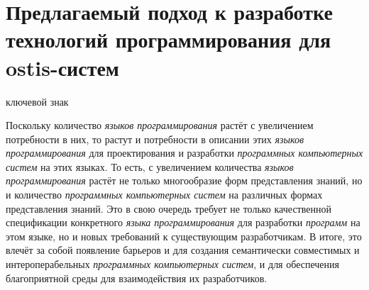 \section{Предлагаемый подход к разработке технологий программирования для ostis-систем}
\label{sec_programs_solution}

\begin{SCn}

\begin{scnrelfromlist}{ключевой знак}
\end{scnrelfromlist}

\end{SCn}

Поскольку количество \textit{языков программирования} растёт с увеличением потребности в них, то растут и потребности в описании этих \textit{языков программирования} для проектирования и разработки \textit{программных компьютерных систем} на этих языках. То есть, с увеличением количества \textit{языков программирования} растёт не только многообразие форм представления знаний, но и количество \textit{программных компьютерных систем} на различных формах представления знаний. Это в свою очередь требует не только качественной спецификации конкретного \textit{языка программирования} для разработки \textit{программ} на этом языке, но и новых требований к существующим разработчикам. В итоге, это влечёт за собой появление барьеров и для создания семантически совместимых и интероперабельных \textit{программных компьютерных систем}, и для обеспечения благоприятной среды для взаимодействия их разработчиков.

